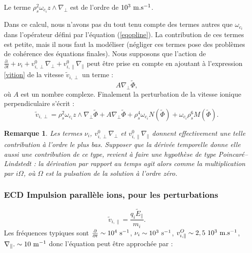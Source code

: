 \documentclass{book}
\newtheorem{rem}{Remarque}[chapter]
\begin{document}
Le terme $\rho_s^2\omega_{c_i}z\wedge\nabla_\perp$ est de l'ordre de
$10^3\ {\rm m.s}^{-1}$.

Dans ce calcul, nous n'avons pas du tout tenu compte des termes autres
que $\omega_{c_i}$ dans l'op\'erateur d\'efini par l'\'equation
(\ref{eqopline}). La contribution de ces termes est petite, mais il nous
faut la mod\'eliser (n\'egliger ces termes pose des probl\`emes de
coh\'erence des \'equations finales).
Nous supposons que l'action de $\frac{\partial.}{\partial t}
+ \nu_i
+{v}^0_{i,\perp}\nabla_\perp
+{v}^0_{i,\parallel}\nabla_\parallel$ peut \^etre prise en compte en
ajoutant \`a l'expression \ref{vition} de la vitesse $\tilde
v_{i,\perp}$ un terme  :
\begin{equation}
A\nabla_\perp\tilde\Phi,
\end{equation}
o\`u $A$ est un nombre complexe. 
Finalement la perturbation de la vitesse ionique perpendiculaire
s'\'ecrit :
\begin{equation}\label{vition2}
\tilde v_{i,\perp}=\rho_s^2\omega_{c_i}z\wedge\nabla_\perp\tilde\Phi
+A\nabla_\perp\tilde\Phi
+\rho_s^4\omega_{c_i}N(\tilde{\Phi})+\omega_{c_i}\rho_s^6M(\tilde\Phi).
\end{equation}

\begin{rem}
Les termes $\nu_i$, ${v}^0_{i,\perp}\nabla_\perp$ et
${v}^0_{i,\parallel}\nabla_\parallel$ donnent effectivement une telle
contribution  \`a l'ordre le plus bas. Supposer que la d\'eriv\'ee
temporelle donne elle aussi une contribution de ce type, revient \`a
faire une hypoth\`ese de type Poincar\'e--Lindstedt : la d\'erivation
par rapport au temps agit alors comme la multiplication par $i\Omega$,
o\`u $\Omega$ est la pulsation de la solution \`a l'ordre z\'ero.
\end{rem}

\subsubsection{ECD Impulsion parall\`ele ions, pour les perturbations}


\begin{equation}
[\nu_i+\frac{\partial}{\partial t}
+v^O_{i,\parallel}\nabla_\parallel.]\tilde{v}_{i,\parallel}
=\frac{q_i\tilde{E}_\parallel}{m_i}.
\end{equation}
Les fr\'equences typiques sont
$\frac{\partial}{\partial t}\sim 10^{4}\ {\rm s}^{-1}$,
$\nu_i\sim 10^{3}\ {\rm s}^{-1}$, 
$v^O_{i,\parallel}\sim 2,5\ 10^{3}\ {\rm m.s}^{-1}$, 
$\nabla_\parallel. \sim 10 \ {\rm m}^{-1}$ 
donc l'\'equation peut \^etre approch\'ee par :
\end{document}
